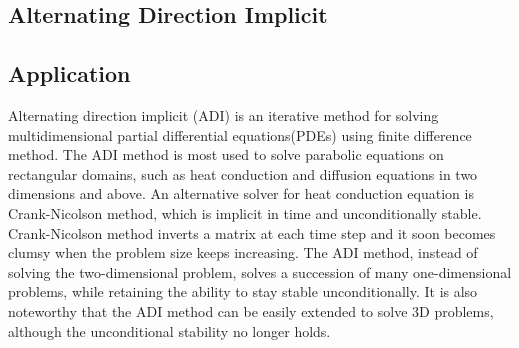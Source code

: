 \documentclass[a4paper,11pt]{article}
\begin{document}
\begin{multicols}{2}
\section{Alternating Direction Implicit}
	\subsection{Application}
	Alternating direction implicit (ADI) is an iterative method for solving multidimensional partial differential equations(PDEs) using finite difference method. The ADI method is most used to solve parabolic equations on rectangular domains, such as heat conduction and diffusion equations in two dimensions and above. An alternative solver for heat conduction equation is Crank-Nicolson method, which is implicit in time and  unconditionally stable.  Crank-Nicolson method inverts a matrix at each time step and it soon becomes clumsy when the problem size keeps increasing. The ADI method, instead of solving the two-dimensional problem, solves a succession of many one-dimensional problems, while retaining the ability to stay stable unconditionally. It is also noteworthy that the ADI method can be easily extended to solve 3D problems, although the unconditional stability no longer holds.

\end{multicols}
\end{document}
